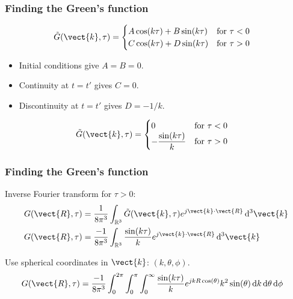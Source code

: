 \documentclass[12 pt, compress, handout, intlimits]{beamer}
\renewcommand{\d}{\operatorname{d}\!}
\newcommand{\ft}[1]{\tilde{#1}}
\begin{document}
\note{}

\begin{frame}[fragile]
    \frametitle{Finding the Green's function}

    
    \vspace{-16pt}
    \begin{align*}
        \ft{G}(\vect{k},\tau) &= 
        \begin{cases}
            A \cos(k \tau) + B\sin(k \tau) & \text{for } \tau < 0
            \\
            C \cos(k \tau) + D\sin(k \tau) & \text{for } \tau > 0
        \end{cases}
    \end{align*}
    
    \begin{itemize}
    \item
        Initial conditions give $ A = B = 0 $.
    \item
        Continuity at $ t = t' $ gives $ C = 0 $.
    \item
        Discontinuity at $ t = t' $ gives $ D = -1/k $.
    \end{itemize}

    \begin{align*}
        \ft{G}(\vect{k},\tau) &= %
        \begin{cases}
            0 & \text{for } \tau < 0
            \\
            -\dfrac{\sin(k \tau)}{k} & \text{for } \tau > 0
        \end{cases}
    \end{align*}

\end{frame}

\note{}

\begin{frame}[fragile]
    \frametitle{Finding the Green's function}

    Inverse Fourier transform for $ \tau > 0 $:
    \begin{align*}
        G(\vect{R},\tau) &= \frac{1}{8 \pi^3} \int_{\mathbb{R}^3} \ft{G}(\vect{k},\tau) e^{j \vect{k} \cdot \vect{R}} \d^3 \vect{k}
        \\
        G(\vect{R},\tau) &= \frac{-1}{8 \pi^3} \int_{\mathbb{R}^3} \frac{\sin(k \tau)}{k} e^{j \vect{k} \cdot \vect{R}} \d^3 \vect{k}
    \end{align*}

    Use spherical coordinates in $ \vect{k} $: $ (k, \theta, \phi) $.
    \begin{align*}
        G(\vect{R},\tau) &= \frac{-1}{8 \pi^3} \int_0^{2 \pi} \int_0^\pi \int_0^\infty \frac{\sin(k \tau)}{k} e^{j k R \cos(\theta)} k^2 \sin(\theta) \d k \d \theta \d \phi
    \end{align*}
    
\end{frame}
\end{document}
